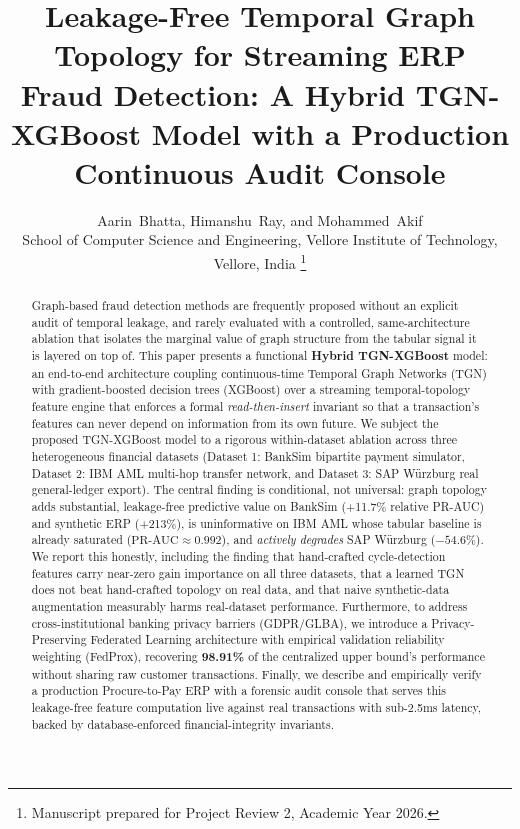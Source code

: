 \documentclass[journal]{IEEEtran}
\begin{document}
\title{Leakage-Free Temporal Graph Topology for Streaming ERP Fraud Detection: A Hybrid TGN-XGBoost Model with a Production Continuous Audit Console}

\author{
Aarin~Bhatta, Himanshu~Ray, and Mohammed~Akif\\
School of Computer Science and Engineering, Vellore Institute of Technology, Vellore, India
\thanks{Manuscript prepared for Project Review 2, Academic Year 2026.}
}


\maketitle

\begin{abstract}
Graph-based fraud detection methods are frequently proposed without an explicit audit of temporal leakage, and rarely evaluated with a controlled, same-architecture ablation that isolates the marginal value of graph structure from the tabular signal it is layered on top of. This paper presents a functional \textbf{Hybrid TGN-XGBoost} model: an end-to-end architecture coupling continuous-time Temporal Graph Networks (TGN) with gradient-boosted decision trees (XGBoost) over a streaming temporal-topology feature engine that enforces a formal \emph{read-then-insert} invariant so that a transaction's features can never depend on information from its own future. We subject the proposed TGN-XGBoost model to a rigorous within-dataset ablation across three heterogeneous financial datasets (Dataset 1: BankSim bipartite payment simulator, Dataset 2: IBM AML multi-hop transfer network, and Dataset 3: SAP W{\"u}rzburg real general-ledger export). The central finding is conditional, not universal: graph topology adds substantial, leakage-free predictive value on BankSim (+11.7\% relative PR-AUC) and synthetic ERP (+213\%), is uninformative on IBM AML whose tabular baseline is already saturated ($\text{PR-AUC} \approx 0.992$), and \emph{actively degrades} SAP W{\"u}rzburg ($-54.6\%$). We report this honestly, including the finding that hand-crafted cycle-detection features carry near-zero gain importance on all three datasets, that a learned TGN does not beat hand-crafted topology on real data, and that naive synthetic-data augmentation measurably harms real-dataset performance. Furthermore, to address cross-institutional banking privacy barriers (GDPR/GLBA), we introduce a Privacy-Preserving Federated Learning architecture with empirical validation reliability weighting (FedProx), recovering \textbf{98.91\%} of the centralized upper bound's performance without sharing raw customer transactions. Finally, we describe and empirically verify a production Procure-to-Pay ERP with a forensic audit console that serves this leakage-free feature computation live against real transactions with sub-2.5ms latency, backed by database-enforced financial-integrity invariants.
\end{abstract}
\end{document}
